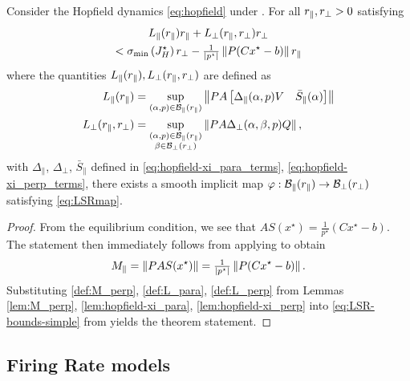 \documentclass[letterpaper, 10 pt, conference]{ieeeconf}
\begin{document}
\begin{theorem}\label{thm:hopfield-bounds}
    Consider the Hopfield dynamics \eqref{eq:hopfield} under . For all \(r_{\parallel},r_{\perp}>0\) satisfying
    \begin{multline}
        L_{\parallel}(r_{\parallel})r_{\parallel} + L_{\perp}(r_{\parallel},r_{\perp})r_{\perp} \\ < \sigma_{\min}\left(J^{\star}_H\right) r_{\perp} - \tfrac{1}{\left\lvert{p^{\star}}\right\rvert} \left\lVert{P(Cx^{\star} - b)}\right\rVert r_{\parallel}
    \end{multline}
    where the quantities \(L_{\parallel}(r_{\parallel}),L_{\perp}(r_{\parallel},r_{\perp})\) are defined as
    \begin{align*}
        L_{\parallel}(r_{\parallel}) & = \underset{(\alpha,p) \in \mathcal{B}_{\parallel}(r_{\parallel})}{\sup} \left\lVert{P A \begin{bmatrix}\Delta_{\parallel}(\alpha,p)V & \bar{S}_{\parallel}(\alpha) \end{bmatrix}}\right\rVert \\
        L_{\perp}(r_{\parallel},r_{\perp}) & = \underset{\substack{(\alpha,p) \in \mathcal{B}_{\parallel}(r_{\parallel})                                                                                                  \\ \beta \in \mathcal{B}_{\perp}(r_{\perp})}}{\sup} \left\lVert{P A \Delta_{\perp}(\alpha,\beta,p) Q}\right\rVert,
    \end{align*}
    with \(\Delta_{\parallel}\), \(\Delta_{\perp}\), \(\bar{S}_{\parallel}\) defined in \eqref{eq:hopfield-xi_para_terms}, \eqref{eq:hopfield-xi_perp_terms}, there exists a smooth implicit map \(\varphi : \mathcal{B}_{\parallel}(r_{\parallel}) \to \mathcal{B}_{\perp}(r_{\perp})\) satisfying \eqref{eq:LSRmap}.
\end{theorem}
\begin{proof}
    From the equilibrium condition, we see that \(AS(x^{\star}) = \frac{1}{p^{\star}} (Cx^{\star} - b)\). The statement then immediately follows from applying  to obtain
    \begin{equation}
        M_{\parallel} = \left\lVert{P A S(x^{\star})}\right\rVert = \tfrac{1}{\left\lvert{p^{\star}}\right\rvert}\left\lVert{P(Cx^{\star} - b)}\right\rVert. \label{eq:M_para}
    \end{equation}
    Substituting \eqref{def:M_perp}, \eqref{def:L_para}, \eqref{def:L_perp} from Lemmas \ref{lem:M_perp}, \ref{lem:hopfield-xi_para}, \ref{lem:hopfield-xi_perp} into \eqref{eq:LSR-bounds-simple} from  yields the theorem statement.
\end{proof}



\subsection{Firing Rate models}
\label{subsec:firing}
\end{document}
